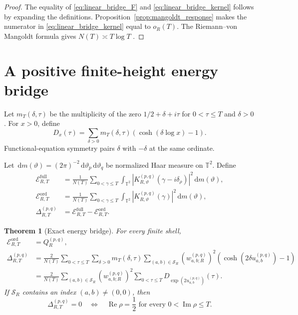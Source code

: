 \documentclass[11pt]{amsart}
\numberwithin{equation}{section}
\theoremstyle{plain}
\newtheorem{theorem}{Theorem}[section]
\theoremstyle{definition}
\theoremstyle{remark}
\newcommand{\Torus}{\mathbb T}
\newcommand{\dd}{\,\mathrm d}
\begin{document}
\begin{proof}
The equality of \eqref{eq:linear_bridge_F} and \eqref{eq:linear_bridge_kernel} follows by expanding the definitions.  Proposition~\ref{prop:mangoldt_response} makes the numerator in \eqref{eq:linear_bridge_kernel} equal to $o_R(T)$.  The Riemann--von Mangoldt formula gives $N(T)\asymp T\log T$ \cite{Titchmarsh1986}.
\end{proof}

\section{A positive finite-height energy bridge}
\label{sec:energy_bridge}

Let $m_T(\delta,\tau)$ be the multiplicity of the zero $1/2+\delta+i\tau$ for $0<\tau\leq T$ and $\delta>0$.  For $x>0$, define
\begin{equation}
D_x(\tau)
=
\sum_{\delta>0}
m_T(\delta,\tau)
\left(\cosh(\delta\log x)-1\right).
\label{eq:Dx}
\end{equation}
Functional-equation symmetry pairs $\delta$ with $-\delta$ at the same ordinate.

Let $\dd m(\vartheta)=(2\pi)^{-2}\dd\vartheta_p\dd\vartheta_q$ be normalized Haar measure on $\Torus^2$.  Define
\begin{align}
\mathcal E_{R,T}^{\mathrm{full}}
&=
\frac1{N(T)}
\sum_{0<\gamma\leq T}
\int_{\Torus^2}
\left|K_{R,\vartheta}^{(p,q)}
(\gamma-i\delta_\rho)\right|^2
\dd m(\vartheta),
\label{eq:full_energy}
\\
\mathcal E_{R,T}^{\mathrm{ord}}
&=
\frac1{N(T)}
\sum_{0<\gamma\leq T}
\int_{\Torus^2}
\left|K_{R,\vartheta}^{(p,q)}(\gamma)\right|^2
\dd m(\vartheta),
\label{eq:ordinate_energy}
\\
\Delta_{R,T}^{(p,q)}
&=
\mathcal E_{R,T}^{\mathrm{full}}
-\mathcal E_{R,T}^{\mathrm{ord}}.
\label{eq:energy_difference}
\end{align}

\begin{theorem}[Exact energy bridge]
\label{thm:exact_energy_bridge}
For every finite shell,
\begin{align}
\mathcal E_{R,T}^{\mathrm{ord}}
&=Q_R^{(p,q)},
\label{eq:exact_ordinate_energy}
\\
\Delta_{R,T}^{(p,q)}
&=
\frac{2}{N(T)}
\sum_{0<\tau\leq T}
\sum_{\delta>0}m_T(\delta,\tau)
\sum_{(a,b)\in\mathcal S_R}
\left(w_{a,b;R}^{(p,q)}\right)^2
\left(\cosh(2\delta u_{a,b}^{(p,q)})-1\right)
\label{eq:positive_energy_bridge}
\\
&=
\frac{2}{N(T)}
\sum_{(a,b)\in\mathcal S_R}
\left(w_{a,b;R}^{(p,q)}\right)^2
\sum_{0<\tau\leq T}
D_{\exp(2u_{a,b}^{(p,q)})}(\tau).
\label{eq:energy_bridge_Dx}
\end{align}
If $\mathcal S_R$ contains an index $(a,b)\neq(0,0)$, then
\begin{equation}
\boxed{
\Delta_{R,T}^{(p,q)}=0
\quad\Longleftrightarrow\quad
\operatorname{Re}\rho=\frac12
\text{ for every }0<\operatorname{Im}\rho\leq T.}
\label{eq:energy_bridge_equivalence}
\end{equation}
\end{theorem}
\end{document}
